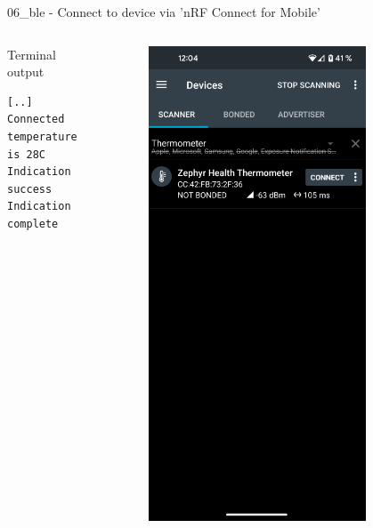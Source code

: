 \documentclass[10pt, aspectratio=169]{beamer}
\begin{document}
\begin{frame}[fragile]{06\_ble - Connect to device via 'nRF Connect for Mobile'}

  \begin{columns}[T,onlytextwidth]

      \begin{exampleblock}{Terminal output}
        {\fontsize{7}{9.6}\selectfont
          \begin{verbatim}
[..]
Connected
temperature is 28C
Indication success
Indication complete
          \end{verbatim}
        }
      \end{exampleblock}

      \begin{figure}
        \includegraphics[width=0.8\textwidth]{images/nrf_connect_scan.png}

\end{figure}
\end{columns}
\end{frame}
\end{document}
